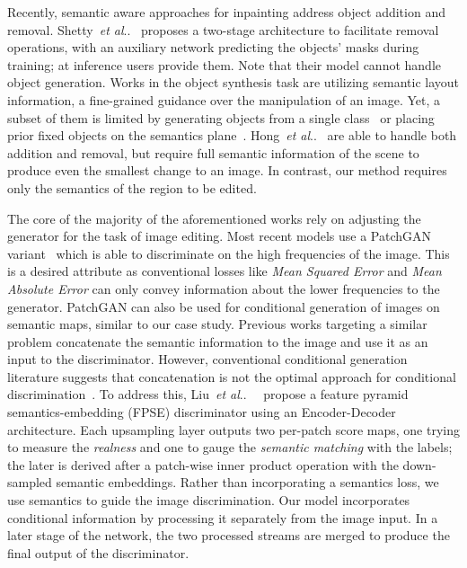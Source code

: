 \documentclass[runningheads]{llncs}
\makeatletter
\DeclareRobustCommand\onedot{\futurelet\@let@token\@onedot}
\def\@onedot{\ifx\@let@token.\else.\null\fi\xspace}
\def\etal{\emph{et al}\onedot}
\def\hong{Hong~\etal~\cite{hong2018learning}}
\def\liu{Liu~\etal~\cite{liu2019learning}\ }
\makeatother
\begin{document}
Recently, semantic aware approaches for inpainting address object addition and removal.
Shetty~\etal~\cite{shetty2018objectremoval} proposes a two-stage architecture to facilitate removal operations, with an auxiliary network predicting the objects' masks during training; at inference users provide them.
Note that their model cannot handle object generation.
Works in the object synthesis task are utilizing semantic layout information, a fine-grained guidance over the manipulation of an image. 
Yet, a subset of them is limited by generating objects from a single class~\cite{ouyang2018pedestrian,Wu_2019_ICCV} or placing prior fixed objects on the semantics plane~\cite{lee2018objectplacement}.
\hong{} are able to handle both addition and removal, but require full semantic information of the scene to produce even the smallest change to an image. In contrast, our method requires only the semantics of the region to be edited.

The core of the majority of the aforementioned works rely on adjusting the generator for the task of image editing. Most recent models use a PatchGAN variant~\cite{isola2017image} which is able to discriminate on the high frequencies of the image. This is a desired attribute as conventional losses like \textit{Mean Squared Error} and \textit{Mean Absolute Error} can only convey information about the lower frequencies to the generator. 
PatchGAN can also be used for conditional generation of images on semantic maps, similar to our case study.
Previous works targeting a similar problem concatenate the semantic information to the image and use it as an input to the discriminator.
However, conventional conditional generation literature suggests that concatenation is not the optimal approach for conditional discrimination~\cite{reed2016generative,odena2016conditional,miyato2018cgans}.
To address this, \liu{} propose a feature pyramid semantics-embedding (FPSE) discriminator using an Encoder-Decoder architecture. Each upsampling layer outputs two per-patch score maps, one trying to measure the \textit{realness} and one to gauge the \textit{semantic matching} with the labels; the later is derived after a patch-wise inner product operation with the down-sampled semantic embeddings.
Rather than incorporating a semantics loss, we use semantics to guide the image discrimination. Our model incorporates conditional information by processing it separately from the image input. In a later stage of the network, the two processed streams are merged to produce the final output of the discriminator. 
\end{document}

